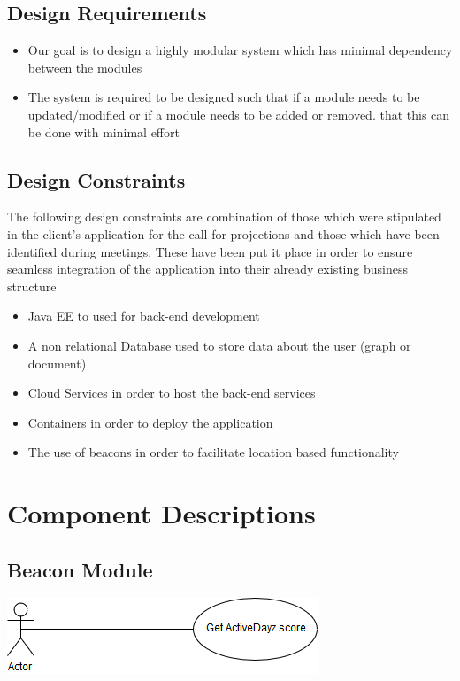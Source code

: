 \documentclass[11pt]{article}
\begin{document}
\subsection{Design Requirements }
\begin{itemize}
\item Our goal is to design a highly modular system which has minimal dependency between the modules
\item The system is required to be designed such that if a module needs to be updated/modified or if a module needs to be added or removed. that this can be done with minimal effort
\end{itemize}
\subsection{Design Constraints}
The following design constraints are combination of those which were stipulated in the client's application for the call for projections and those which have been identified during meetings. These have been put it place in order to ensure seamless integration of the application into their already existing business structure
\begin{itemize}
\item Java EE to used for back-end development
\item A non relational Database used to store data about the user (graph or document)
\item Cloud Services in order to host the back-end services 
\item Containers in order to deploy the application 
\item The use of beacons in order to facilitate location based functionality
\end{itemize}

\section{Component Descriptions}
\subsection{Beacon Module}
\includegraphics[width=0.7\linewidth]{images/Beacon.png}\\[1cm]
\end{document}
